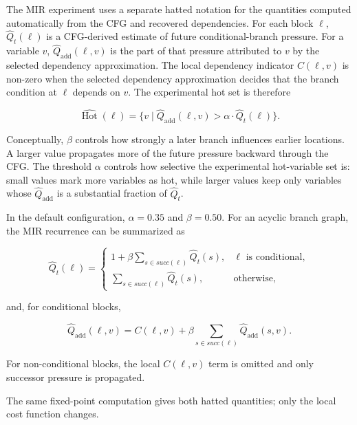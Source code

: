 \documentclass[conference]{IEEEtran}
\begin{document}
The MIR experiment uses a separate hatted notation for the quantities computed
automatically from the CFG and recovered dependencies. For each block \(\ell\),
\(\widehat{Q}_t(\ell)\) is a CFG-derived estimate of future
conditional-branch pressure. For a variable \(v\),
\(\widehat{Q}_{\mathrm{add}}(\ell,v)\) is the part of that pressure attributed
to \(v\) by the selected dependency approximation. The local dependency
indicator \(C(\ell,v)\) is non-zero when the selected dependency approximation
decides that the branch condition at \(\ell\) depends on \(v\). The
experimental hot set is therefore

\[
\widehat{\operatorname{Hot}}(\ell)
=
\{v \mid
\widehat{Q}_{\mathrm{add}}(\ell,v)
> \alpha \cdot \widehat{Q}_t(\ell)\}.
\]

Conceptually, \(\beta\) controls how strongly a later branch influences
earlier locations. A larger value propagates more of the future pressure
backward through the CFG. The threshold \(\alpha\) controls how selective the
experimental hot-variable set is: small values mark more variables as hot,
while larger values keep only variables whose
\(\widehat{Q}_{\mathrm{add}}\) is a substantial fraction of
\(\widehat{Q}_t\).

In the default configuration, \(\alpha=0.35\) and \(\beta=0.50\). For an acyclic branch
graph, the MIR recurrence can be summarized as

\[
\widehat{Q}_t(\ell)=
\begin{cases}
1 + \beta \sum_{s \in succ(\ell)} \widehat{Q}_t(s), & \ell \text{ is conditional},\\
\sum_{s \in succ(\ell)} \widehat{Q}_t(s), & \text{otherwise},
\end{cases}
\]

and, for conditional blocks,

\[
\widehat{Q}_{\mathrm{add}}(\ell,v)=
C(\ell,v) + \beta \sum_{s \in succ(\ell)} \widehat{Q}_{\mathrm{add}}(s,v).
\]

For non-conditional blocks, the local \(C(\ell,v)\) term is omitted and only
successor pressure is propagated.

The same fixed-point computation gives both hatted quantities; only the local
cost function changes.
\end{document}
